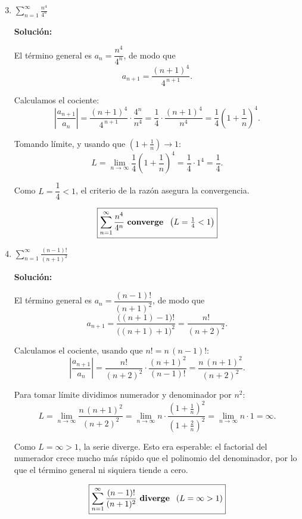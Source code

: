 \documentclass[12pt]{article}
\newcommand{\solucion}{%
    \vspace{0.8em}%
    \textbf{Solución:}%
}
\begin{document}
\begin{enumerate}[label=\alph*.-]

    \setcounter{enumi}{2} %

    \item $\displaystyle\sum_{n=1}^{\infty}\frac{n^{4}}{4^{n}}$

    \solucion

    El término general es $a_n=\dfrac{n^{4}}{4^{n}}$, de modo que
    \[
    a_{n+1}=\frac{(n+1)^{4}}{4^{\,n+1}} .
    \]

    Calculamos el cociente:
    \[
    \left|\frac{a_{n+1}}{a_n}\right|
    =\frac{(n+1)^{4}}{4^{\,n+1}}\cdot\frac{4^{n}}{n^{4}}
    =\frac{1}{4}\cdot\frac{(n+1)^{4}}{n^{4}}
    =\frac14\left(1+\frac1n\right)^{4}.
    \]

    Tomando límite, y usando que $\left(1+\frac1n\right)\to 1$:
    \[
    L=\lim_{n\to\infty}\frac14\left(1+\frac1n\right)^{4}
    =\frac14\cdot 1^{4}=\frac14 .
    \]

    Como $L=\dfrac14<1$, el criterio de la razón asegura la convergencia.

    \[
    \boxed{
    \sum_{n=1}^{\infty}\frac{n^{4}}{4^{n}}
    \text{ \textbf{converge} }\;\left(L=\tfrac14<1\right)
    }
    \]

    \item $\displaystyle\sum_{n=1}^{\infty}\frac{(n-1)!}{(n+1)^{2}}$

    \solucion

    El término general es $a_n=\dfrac{(n-1)!}{(n+1)^{2}}$, de modo que
    \[
    a_{n+1}=\frac{\big((n+1)-1\big)!}{\big((n+1)+1\big)^{2}}
    =\frac{n!}{(n+2)^{2}} .
    \]

    Calculamos el cociente, usando que $n!=n\,(n-1)!$:
    \[
    \left|\frac{a_{n+1}}{a_n}\right|
    =\frac{n!}{(n+2)^{2}}\cdot\frac{(n+1)^{2}}{(n-1)!}
    =\frac{n\,(n+1)^{2}}{(n+2)^{2}} .
    \]

    Para tomar límite dividimos numerador y denominador por $n^{2}$:
    \[
    L=\lim_{n\to\infty}\frac{n\,(n+1)^{2}}{(n+2)^{2}}
    =\lim_{n\to\infty} n\cdot\frac{\left(1+\frac1n\right)^{2}}
                                   {\left(1+\frac2n\right)^{2}}
    =\lim_{n\to\infty} n\cdot 1=\infty .
    \]

    Como $L=\infty>1$, la serie diverge. Esto era esperable: el factorial del
    numerador crece mucho más rápido que el polinomio del denominador, por lo
    que el término general ni siquiera tiende a cero.

    \[
    \boxed{
    \sum_{n=1}^{\infty}\frac{(n-1)!}{(n+1)^{2}}
    \text{ \textbf{diverge} }\;\left(L=\infty>1\right)
    }
    \]

\end{enumerate}
\end{document}
